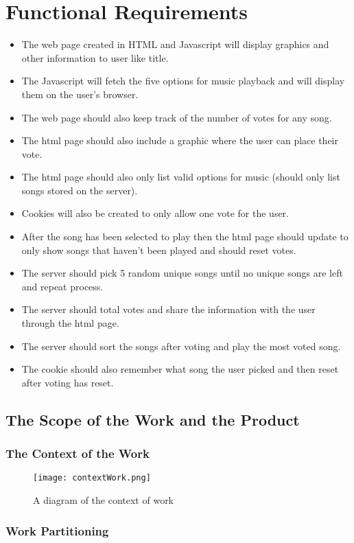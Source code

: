 \documentclass[12pt, titlepage]{article}
\begin{document}
\section{Functional Requirements}
 \begin{itemize}
 \item The web page created in HTML and Javascript will display graphics and other information to user like title.
 \item The Javascript will fetch the five options for music playback and will display them on the user's browser.
 \item The web page should also keep track of the number of votes for any song.
 \item The html page should also include a graphic where the user can place their vote.
 \item The html page should also only list valid options for music (should only list songs stored on the server).
 \item Cookies will also be created to only allow one vote for the user.
 \item After the song has been selected to play then the html page should update to only show songs that haven't been played and should reset votes.
 \item The server should pick 5 random unique songs until no unique songs are left and repeat process.
 \item The server should total votes and share the information with the user through the html page.
 \item The server should sort the songs after voting and play the most voted song.
 \item The cookie should also remember what song the user picked and then reset after voting has reset.
 \end{itemize}

\subsection{The Scope of the Work and the Product}

\subsubsection{The Context of the Work}
\begin{figure}[!ht]
  \caption{A diagram of the context of work}
  \centering
    \texttt{[image: contextWork.png]}
\end{figure}
\subsubsection{Work Partitioning}
\end{document}
